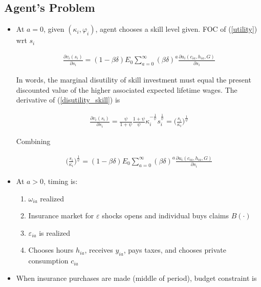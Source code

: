 \documentclass{article}
\begin{document}
\subsection{Agent's Problem}

\begin{itemize}

\item At $a = 0$, given $(\kappa_i, \varphi_i)$, agent chooses a skill level given. FOC of (\ref{utility}) wrt $s_i$

\begin{align*}
\frac{\partial v_i(s_i)}{\partial s_i} = (1 - \beta \delta) E_0 \sum_{a = 0}^\infty (\beta \delta)^a \frac{\partial u_i(c_{ia}, h_{ia}, G)}{\partial s_i}
\end{align*}

In words, the marginal disutility of skill investment must equal the present discounted value of the higher associated expected lifetime wages. The derivative of (\ref{disutility_skill}) is

\begin{align*}
\frac{\partial v_i(s_i)}{\partial s_i} = \frac{\psi}{1 + \psi} \frac{1 + \psi}{\psi}\kappa_i^{-\frac{1}{\psi}} s_i^\frac{1}{\psi} = \Bigg(\frac{s_i}{\kappa_i}\Bigg)^{\frac{1}{\psi}}
\end{align*}

Combining

\begin{align}
\Bigg(\frac{s_i}{\kappa_i}\Bigg)^{\frac{1}{\psi}} = (1 - \beta \delta) E_0 \sum_{a = 0}^\infty (\beta \delta)^a \frac{\partial u_i(c_{ia}, h_{ia}, G)}{\partial s_i}
\end{align}

\item At $a > 0$, timing is: 

\begin{enumerate}

\item $\omega_{ia}$ realized
\item Insurance market for $\varepsilon$ shocks opens and individual buys claims $B(\cdot)$
\item $\varepsilon_{ia}$ is realized
\item Chooses hours $h_{ia}$, receives $y_{ia}$, pays taxes, and chooses private consumption $c_{ia}$

\end{enumerate}

\item When insurance purchases are made (middle of period), budget constraint is


\end{itemize}
\end{document}
